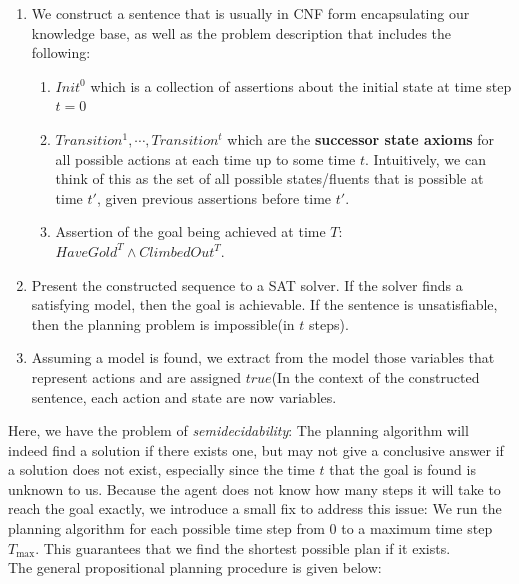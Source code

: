 \documentclass[11pt]{article}
\begin{document}
\begin{enumerate}
    \item We construct a sentence that is usually in CNF form encapsulating our knowledge base, as well as the problem description that includes the following:
    \begin{enumerate}
        \item $Init^0$ which is a collection of assertions about the initial state at time step $t=0$
        \item $Transition^1, \cdots, Transition^t$ which are the \textbf{successor state axioms} for all possible actions at each time up to some time $t$. Intuitively, we can think of this as the set of all possible states/fluents that is possible at time $t'$, given previous assertions before time $t'$.
        \item Assertion of the goal being achieved at time $T$: $HaveGold^T \land ClimbedOut^T$.
    \end{enumerate}
    
    \item Present the constructed sequence to a SAT solver. If the solver finds a satisfying model, then the goal is achievable. If the sentence is unsatisfiable, then the planning problem is impossible(in $t$ steps). 
    
    \item Assuming a model is found, we extract from the model those variables that represent actions and are assigned $true$(In the context of the constructed sentence, each action and state are now variables.
\end{enumerate}

Here, we have the problem of \textit{semidecidability}: The planning algorithm will indeed find a solution if there exists one, but may not give a conclusive answer if a solution does not exist, especially since the time $t$ that the goal is found is unknown to us. Because the agent does not know how many steps it will take to reach the goal exactly, we introduce a small fix to address this issue: We run the planning algorithm for each possible time step from 0 to a maximum time step $T_{\max}$. This guarantees that we find the shortest possible plan if it exists.\\

The general propositional planning procedure is given below:
\end{document}

